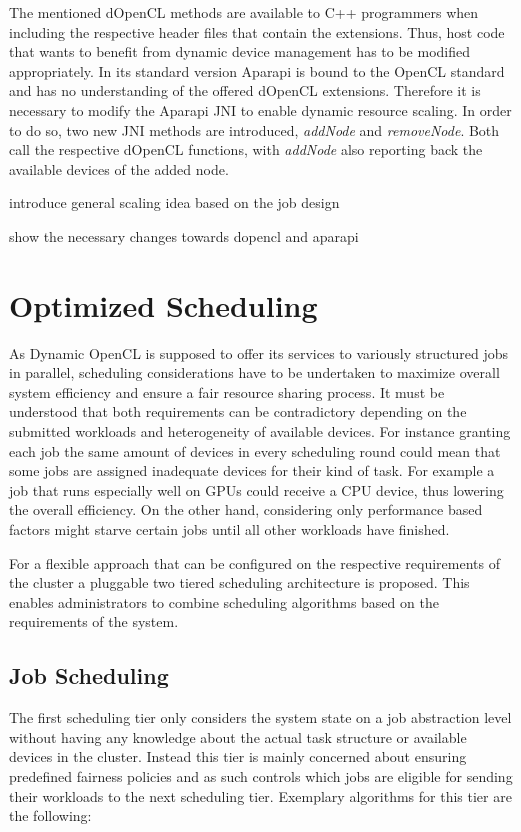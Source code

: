 The mentioned dOpenCL methods are available to C++ programmers when including the respective header files that contain the extensions. Thus, host code that wants to benefit from dynamic device management has to be modified appropriately. In its standard version Aparapi is bound to the OpenCL standard and has no understanding of the offered dOpenCL extensions. Therefore it is necessary to modify the Aparapi JNI to enable dynamic resource scaling. In order to do so, two new JNI methods are introduced, \textit{addNode} and \textit{removeNode}. Both call the respective dOpenCL functions, with \textit{addNode} also reporting back the available devices of the added node.

introduce general scaling idea based on the job design

show the necessary changes towards dopencl and aparapi

\section{Optimized Scheduling}

As Dynamic OpenCL is supposed to offer its services to variously structured jobs in parallel, scheduling considerations have to be undertaken to maximize overall system efficiency and ensure a fair resource sharing process. It must be understood that both requirements can be contradictory depending on the submitted workloads and heterogeneity of available devices. For instance granting each job the same amount of devices in every scheduling round could mean that some jobs are assigned inadequate devices for their kind of task. For example a job that runs especially well on GPUs could receive a CPU device, thus lowering the overall efficiency. On the other hand, considering only performance based factors might starve certain jobs until all other workloads have finished.

For a flexible approach that can be configured on the respective requirements of the cluster a pluggable two tiered scheduling architecture is proposed. This enables administrators to combine scheduling algorithms based on the requirements of the system. 

\subsection{Job Scheduling}
The first scheduling tier only considers the system state on a job abstraction level without having any knowledge about the actual task structure or available devices in the cluster. Instead this tier is mainly concerned about ensuring predefined fairness policies and as such controls which jobs are eligible for sending their workloads to the next scheduling tier. Exemplary algorithms for this tier are the following:

